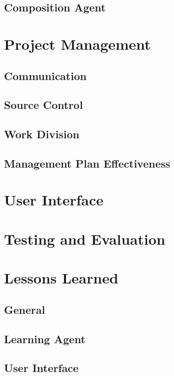 \documentclass{article}
\begin{document}
\subsection{Composition Agent}


\section{Project Management}
\subsection{Communication}

\subsection{Source Control}

\subsection{Work Division}

\subsection{Management Plan Effectiveness}


\section{User Interface}


\section{Testing and Evaluation}


\section{Lessons Learned}
\subsection{General}

\subsection{Learning Agent}

\subsection{User Interface}
\end{document}
